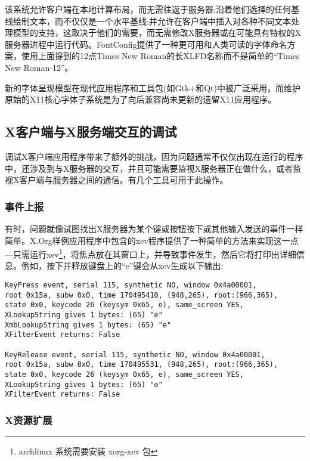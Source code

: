 该系统允许客户端在本地计算布局，而无需往返于服务器;沿着他们选择的任何基线绘制文本，而不仅仅是一个水平基线;并允许在客户端中插入对各种不同文本处理模型的支持，这取决于他们的需要，而无需修改X服务器或在可能具有特权的X服务器进程中运行代码。FontConfig提供了一种更可用和人类可读的字体命名方案，使用上面提到的12点Times New Roman的长XLFD名称而不是简单的“Times New Roman-12”。

新的字体呈现模型在现代应用程序和工具包(如Gtk+和Qt)中被广泛采用，而维护原始的X11核心字体子系统是为了向后兼容尚未更新的遗留X11应用程序。

\subsection{X客户端与X服务端交互的调试}

调试X客户端应用程序带来了额外的挑战，因为问题通常不仅仅出现在运行的程序中，还涉及到与X服务器的交互，并且可能需要监视X服务器正在做什么，或者监视X客户端与服务器之间的通信。有几个工具可用于此操作。

\subsubsection{事件上报}

有时，问题就像试图找出X服务器为某个键或按钮按下或其他输入发送的事件一样简单。X.Org样例应用程序中包含的xev程序提供了一种简单的方法来实现这一点—只需运行xev\footnote{archlinux 系统需要安装 xorg-xev 包}，将焦点放在其窗口上，并导致事件发生，然后它将打印出详细信息。例如，按下并释放键盘上的“e”键会从xev生成以下输出:

\begin{lstlisting}
KeyPress event, serial 115, synthetic NO, window 0x4a00001,
root 0x15a, subw 0x0, time 170495410, (948,265), root:(966,365),
state 0x0, keycode 26 (keysym 0x65, e), same_screen YES,
XLookupString gives 1 bytes: (65) "e"
XmbLookupString gives 1 bytes: (65) "e"
XFilterEvent returns: False

KeyRelease event, serial 115, synthetic NO, window 0x4a00001,
root 0x15a, subw 0x0, time 170495531, (948,265), root:(966,365),
state 0x0, keycode 26 (keysym 0x65, e), same_screen YES,
XLookupString gives 1 bytes: (65) "e"
XFilterEvent returns: False
\end{lstlisting}

\subsubsection{X资源扩展}

